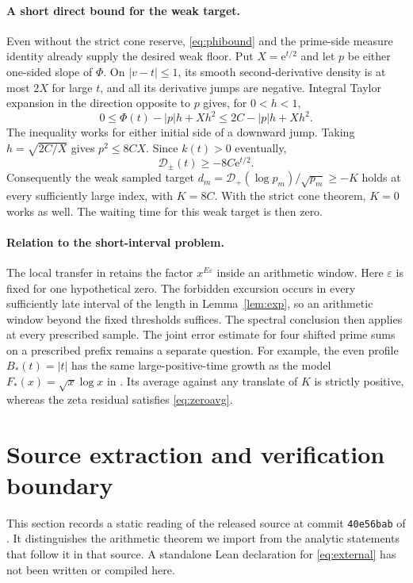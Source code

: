 \documentclass[11pt,a4paper]{article}
\theoremstyle{remark}\newtheorem{remark}[theorem]{Remark}
\newcommand{\e}{\mathrm e}
\newcommand{\D}{\mathcal D}
\begin{document}
\paragraph{A short direct bound for the weak target.}
Even without the strict cone reserve, \eqref{eq:phibound} and
the prime-side measure identity already supply the desired weak
floor. Put \(X=\e^{t/2}\) and let \(p\) be either one-sided slope
of \(\Phi\). On \(|v-t|\le1\), its smooth second-derivative
density is at most \(2X\) for large \(t\), and all its derivative
jumps are negative. Integral Taylor expansion in the direction
opposite to \(p\) gives, for \(0<h<1\),
\[
 0\le\Phi(t)-|p|h+Xh^2\le2C-|p|h+Xh^2.
\]
The inequality works for either initial side of a downward jump.
Taking \(h=\sqrt{2C/X}\) gives \(p^2\le8CX\). Since \(k(t)>0\)
eventually,
\begin{equation}
 \D_\pm(t)\ge-8C\e^{t/2}.\label{eq:weak}
\end{equation}
Consequently the weak sampled target
\(d_m=\D_+(\log p_m)/\sqrt{p_m}\ge-K\) holds at every
sufficiently large index, with \(K=8C\). With the strict cone
theorem, \(K=0\) works as well. The waiting time for this weak
target is then zero.

\paragraph{Relation to the short-interval problem.}
The local transfer in \cite{Polak} retains the factor
\(x^{E\varepsilon}\) inside an arithmetic window.
Here \(\varepsilon\) is fixed for one hypothetical zero. The forbidden
excursion occurs in every sufficiently late interval of the length in
Lemma~\ref{lem:exp}, so an arithmetic window beyond the fixed thresholds
suffices. The spectral conclusion then applies at every prescribed sample.
The joint error estimate for four shifted prime sums on a prescribed
prefix remains a separate question. For example, the even profile
\(B_*(t)=|t|\) has the same large-positive-time growth as the model
\(F_*(x)=\sqrt{x}\log x\) in \cite{Polak}. Its average against any
translate of \(K\) is strictly positive, whereas the zeta residual
satisfies \eqref{eq:zeroavg}.

\section{Source extraction and verification boundary}\label{sec:audit}
This section records a static reading of the released source at
commit \texttt{40e56bab} of \cite{Source}. It distinguishes the
arithmetic theorem we import from the analytic statements that
follow it in that source. A standalone Lean declaration for
\eqref{eq:external} has not been written or compiled here.
\end{document}

